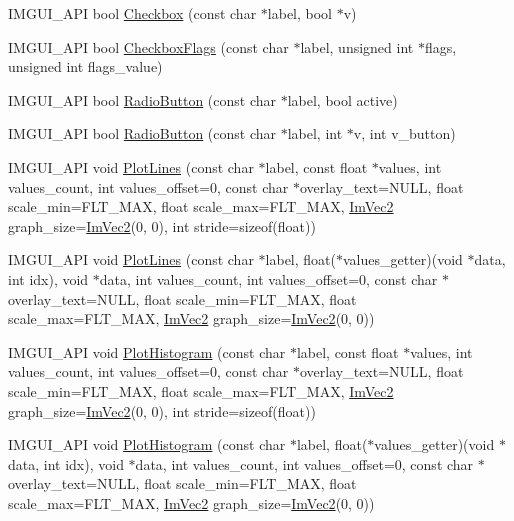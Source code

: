 \begin{DoxyCompactItemize}
\item 
I\+M\+G\+U\+I\+\_\+\+A\+PI bool \hyperlink{namespace_im_gui_a57d73c1d0ef807fef734d91024092027}{Checkbox} (const char $\ast$label, bool $\ast$v)
\item 
I\+M\+G\+U\+I\+\_\+\+A\+PI bool \hyperlink{namespace_im_gui_aeca400dcf5a82c312b3e669d2fe6e88d}{Checkbox\+Flags} (const char $\ast$label, unsigned int $\ast$flags, unsigned int flags\+\_\+value)
\item 
I\+M\+G\+U\+I\+\_\+\+A\+PI bool \hyperlink{namespace_im_gui_a6b146763845cbad5a4144772279631bc}{Radio\+Button} (const char $\ast$label, bool active)
\item 
I\+M\+G\+U\+I\+\_\+\+A\+PI bool \hyperlink{namespace_im_gui_a018d2b61d2f00bb7a9dd2b1f933b93a5}{Radio\+Button} (const char $\ast$label, int $\ast$v, int v\+\_\+button)
\item 
I\+M\+G\+U\+I\+\_\+\+A\+PI void \hyperlink{namespace_im_gui_a2bc21c56e4796855313804086cca114f}{Plot\+Lines} (const char $\ast$label, const float $\ast$values, int values\+\_\+count, int values\+\_\+offset=0, const char $\ast$overlay\+\_\+text=N\+U\+LL, float scale\+\_\+min=F\+L\+T\+\_\+\+M\+AX, float scale\+\_\+max=F\+L\+T\+\_\+\+M\+AX, \hyperlink{struct_im_vec2}{Im\+Vec2} graph\+\_\+size=\hyperlink{struct_im_vec2}{Im\+Vec2}(0, 0), int stride=sizeof(float))
\item 
I\+M\+G\+U\+I\+\_\+\+A\+PI void \hyperlink{namespace_im_gui_a94a2645d45c96da35b834dc7db93a9f1}{Plot\+Lines} (const char $\ast$label, float($\ast$values\+\_\+getter)(void $\ast$data, int idx), void $\ast$data, int values\+\_\+count, int values\+\_\+offset=0, const char $\ast$overlay\+\_\+text=N\+U\+LL, float scale\+\_\+min=F\+L\+T\+\_\+\+M\+AX, float scale\+\_\+max=F\+L\+T\+\_\+\+M\+AX, \hyperlink{struct_im_vec2}{Im\+Vec2} graph\+\_\+size=\hyperlink{struct_im_vec2}{Im\+Vec2}(0, 0))
\item 
I\+M\+G\+U\+I\+\_\+\+A\+PI void \hyperlink{namespace_im_gui_af7a92b2118981835b5251bfdaac50252}{Plot\+Histogram} (const char $\ast$label, const float $\ast$values, int values\+\_\+count, int values\+\_\+offset=0, const char $\ast$overlay\+\_\+text=N\+U\+LL, float scale\+\_\+min=F\+L\+T\+\_\+\+M\+AX, float scale\+\_\+max=F\+L\+T\+\_\+\+M\+AX, \hyperlink{struct_im_vec2}{Im\+Vec2} graph\+\_\+size=\hyperlink{struct_im_vec2}{Im\+Vec2}(0, 0), int stride=sizeof(float))
\item 
I\+M\+G\+U\+I\+\_\+\+A\+PI void \hyperlink{namespace_im_gui_af8089203baf8cf723a158c9e34bda2a4}{Plot\+Histogram} (const char $\ast$label, float($\ast$values\+\_\+getter)(void $\ast$data, int idx), void $\ast$data, int values\+\_\+count, int values\+\_\+offset=0, const char $\ast$overlay\+\_\+text=N\+U\+LL, float scale\+\_\+min=F\+L\+T\+\_\+\+M\+AX, float scale\+\_\+max=F\+L\+T\+\_\+\+M\+AX, \hyperlink{struct_im_vec2}{Im\+Vec2} graph\+\_\+size=\hyperlink{struct_im_vec2}{Im\+Vec2}(0, 0))

\end{DoxyCompactItemize}

